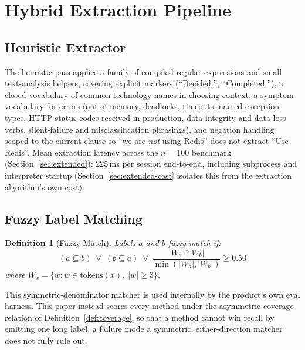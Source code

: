 \documentclass[journal]{IEEEtran}
\newtheorem{definition}{Definition}
\begin{document}
\section{Hybrid Extraction Pipeline}
\label{sec:extraction}

\subsection{Heuristic Extractor}

The heuristic pass applies a family of compiled regular
expressions and small text-analysis helpers, covering explicit
markers (``Decided:'', ``Completed:''), a closed vocabulary of
common technology names in choosing context, a symptom
vocabulary for errors (out-of-memory, deadlocks, timeouts,
named exception types, HTTP status codes received in
production, data-integrity and data-loss verbs, silent-failure
and misclassification phrasings), and negation handling scoped
to the current clause so ``we are \emph{not} using Redis''
does not extract ``Use Redis''.
Mean extraction latency across the $n=100$ benchmark
(Section~\ref{sec:extended}): 225\,ms per session end-to-end,
including subprocess and interpreter startup
(Section~\ref{sec:extended-cost} isolates this from the
extraction algorithm's own cost).

\subsection{Fuzzy Label Matching}
\label{sec:fuzzy}

\begin{definition}[Fuzzy Match]
\label{def:fuzzy}
Labels $a$ and $b$ fuzzy-match if:
\begin{equation}
  (a \subseteq b) \;\vee\; (b \subseteq a) \;\vee\;
  \frac{|W_a \cap W_b|}{\min(|W_a|, |W_b|)} \geq 0.50
  \label{eq:fuzzy}
\end{equation}
where $W_x = \{w : w \in \mathrm{tokens}(x),\; |w| \geq 3\}$.
\end{definition}

This symmetric-denominator matcher is used internally by the
product's own eval harness. This paper instead scores every
method under the asymmetric coverage relation of
Definition~\ref{def:coverage}, so that a method cannot win
recall by emitting one long label, a failure mode a
symmetric, either-direction matcher does not fully rule out.
\end{document}
